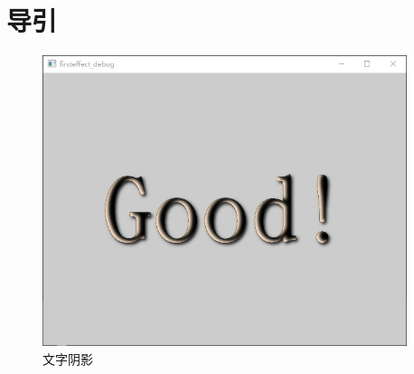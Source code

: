 ﻿




\FloatBarrier
\section{
导引
}\label{c000015s000001}


\begin{figure}[htb] %
\marginnote{\setlength\fboxsep{2pt}\fbox{\footnotesize{\kaishu\figurename\,}\footnotesize{\ref{p000012}}}}\centering %
\includegraphics[width=0.95\textwidth]{../chapter06/firsteffect/the_app.png} %
\caption{文字阴影} %
\label{p000012} %
\end{figure}


